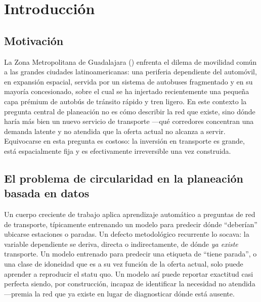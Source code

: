 \chapter{Introducción}
\label{ch:introduccion}

\section{Motivación}
\label{sec:intro-motivacion}

La Zona Metropolitana de Guadalajara (\zmg) enfrenta el dilema de movilidad común a las
grandes ciudades latinoamericanas: una periferia dependiente del automóvil, en expansión
espacial, servida por un sistema de autobuses fragmentado y en su mayoría concesionado,
sobre el cual se ha injertado recientemente una pequeña capa prémium de autobús de tránsito
rápido y tren ligero. En este contexto la pregunta central de planeación no es cómo
describir la red que existe, sino dónde haría más bien un nuevo servicio de transporte
---qué corredores concentran una demanda latente y no atendida que la oferta actual no
alcanza a servir. Equivocarse en esta pregunta es costoso: la inversión en transporte es
grande, está espacialmente fija y es efectivamente irreversible una vez construida.

\section{El problema de circularidad en la planeación basada en datos}
\label{sec:intro-circularidad}

Un cuerpo creciente de trabajo aplica aprendizaje automático a preguntas de red de
transporte, típicamente entrenando un modelo para predecir dónde ``deberían'' ubicarse
estaciones o paradas. Un defecto metodológico recurrente lo socava: la variable
dependiente se deriva, directa o indirectamente, de dónde \emph{ya existe} transporte. Un
modelo entrenado para predecir una etiqueta de ``tiene parada'', o una clase de idoneidad
que es a su vez función de la oferta actual, solo puede aprender a reproducir el statu quo.
Un modelo así puede reportar exactitud casi perfecta siendo, por construcción, incapaz de
identificar la necesidad no atendida ---premia la red que ya existe en lugar de diagnosticar
dónde está ausente.

